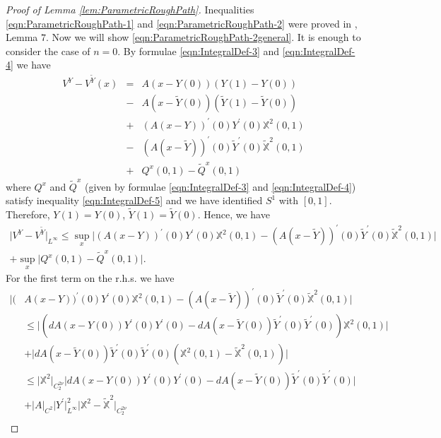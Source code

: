 \documentclass[11pt,a4paper,leqno]{amsart}%
\theoremstyle{plain}
\theoremstyle{remark}
\theoremstyle{plain}
\numberwithin{equation}{section}
\def\supl{\sup\limits}
\def\supl{\mathop{\sup}\limits}
\begin{document}
\begin{proof}[ Proof of Lemma \ref{lem:ParametricRoughPath}]
Inequalities \eqref{eqn:ParametricRoughPath-1} and
\eqref{eqn:ParametricRoughPath-2} were proved in
\cite{[Bess+Gub_2005]}, Lemma $7$. Now we will show
\eqref{eqn:ParametricRoughPath-2general}. It is enough to consider
the case of $n=0$. By formulae \eqref{eqn:IntegralDef-3} and
\eqref{eqn:IntegralDef-4} we have
\begin{eqnarray}
V^Y-V^{\tilde{Y}}(x)&=&A(x-Y(0))(Y(1)-Y(0))
\nonumber\\
&-&A(x-\tilde{Y}(0))(\tilde{Y}(1)-\tilde{Y}(0))\nonumber\\
&+&(A(x-Y))^\prime(0)Y^\prime(0)\mathbb{X}^2(0,1)
\nonumber\\
&-&(A(x-\tilde{Y}))^\prime(0)\tilde{Y}^\prime(0)\mathbb{\tilde{X}}^2(0,1)
\nonumber\\
&+&Q^x(0,1)-\tilde{Q}^x(0,1)\nonumber
\end{eqnarray}
where $Q^x$ and $\tilde{Q}^x$ (given by formulae
\eqref{eqn:IntegralDef-3} and \eqref{eqn:IntegralDef-4}) satisfy
inequality \eqref{eqn:IntegralDef-5} and we have identified $S^1$
with $[0,1]$. Therefore, $Y(1)=Y(0)$, $\tilde{Y}(1)=\tilde{Y}(0)$.
Hence, we have
\begin{multline}\label{eqn:PRaux-1}
\vert V^Y-V^{\tilde{Y}}\vert_{L^{\infty}}\leq
\supl_x\vert (A(x-Y))^\prime(0)Y^\prime(0)\mathbb{X}^2(0,1)-
(A(x-\tilde{Y}))^\prime(0)\tilde{Y}^\prime(0)\mathbb{\tilde{X}}^2(0,1)\vert \\
+\supl_x\vert Q^x(0,1)-\tilde{Q}^x(0,1)\vert .
\end{multline}
For the first term on the r.h.s. we have
\begin{align}\label{eqn:PRaux-2}
\vert (&A(x-Y))^\prime(0)Y^\prime(0)\mathbb{X}^2(0,1)-
(A(x-\tilde{Y}))^\prime(0)\tilde{Y}^\prime(0)\mathbb{\tilde{X}}^2(0,1)\vert \\
&\leq
\vert (dA(x-Y(0))Y^\prime(0)Y^\prime(0)-dA(x-\tilde{Y}(0))\tilde{Y}^\prime(0)\tilde{Y}^\prime(0))\mathbb{X}^2(0,1)\vert \nonumber\\
&+\vert dA(x-\tilde{Y}(0))\tilde{Y}^\prime(0)\tilde{Y}^\prime(0)(\mathbb{X}^2(0,1)-\mathbb{\tilde{X}}^2(0,1))\vert \nonumber\\
&\leq \vert \mathbb{X}^2\vert_{C_2^{2\nu}}\vert dA(x-Y(0))Y^\prime(0)Y^\prime(0)-dA(x-\tilde{Y}(0))\tilde{Y}^\prime(0)\tilde{Y}^\prime(0)\vert \nonumber\\
&+ \vert A\vert_{C^2}\vert Y^\prime\vert_{L^{\infty}}^2\vert \mathbb{X}^2-\mathbb{\tilde{X}}^2\vert_{C_2^{2\nu}}\nonumber\\

\end{align}
\end{proof}
\end{document}
